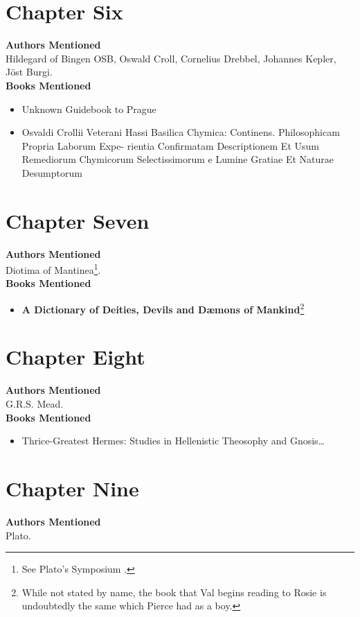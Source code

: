 \documentclass[twoside,10pt]{report}
\begin{document}
\section{Chapter Six}
\textbf{Authors Mentioned}\\
Hildegard of Bingen OSB, Oswald Croll, Cornelius Drebbel, Johannes Kepler, Jöst Burgi.
\\

\textbf{Books Mentioned}
\begin{itemize}
\item Unknown Guidebook to Prague \cite{UnknownPre1967}
\item Osvaldi Crollii Veterani Hassi Basilica Chymica: Continens. Philosophicam Propria Laborum Expe-
rientia Confirmatam Descriptionem Et Usum Remediorum Chymicorum Selectissimorum e Lumine
Gratiae Et Naturae Desumptorum \cite{Croll1611}
\end{itemize}

\section{Chapter Seven}
\textbf{Authors Mentioned}\\
Diotima of Mantinea\footnote{See Plato’s Symposium \cite{Plato1925}.}.
\\

\textbf{Books Mentioned}
\begin{itemize}
\item \textbf{A Dictionary of Deities, Devils and Dæmons of Mankind}\footnote{While not stated by name, the book that Val begins reading to Rosie is undoubtedly the same which Pierce had as a boy.} \cite{St.Phalle}
\end{itemize}

\section{Chapter Eight}
\textbf{Authors Mentioned}\\
G.R.S. Mead.
\\

\textbf{Books Mentioned}
\begin{itemize}
\item Thrice-Greatest Hermes: Studies in Hellenistic Theosophy and Gnosis\ldots \cite{Mead1906}
\end{itemize}

\section{Chapter Nine}
\textbf{Authors Mentioned}\\
Plato.
\\
\end{document}
